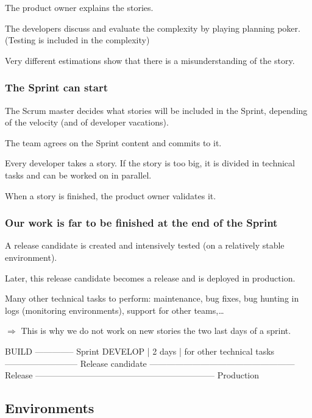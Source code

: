 \documentclass[a4paper, 11pt]{article}
\begin{document}
    The product owner explains the stories.

    The developers discuss and evaluate the complexity by playing planning poker. (Testing is included in the complexity)

    Very different estimations show that there is a misunderstanding of the story.

    \subsubsection{The Sprint can start}

    The Scrum master decides what stories will be included in the Sprint, depending of the velocity (and of developer vacations).

    The team agrees on the Sprint content and commits to it.

    Every developer takes a story. If the story is too big, it is divided in technical tasks and can be worked on in parallel.

    When a story is finished, the product owner validates it.

    \subsubsection{Our work is far to be finished at the end of the Sprint}

    A release candidate is created and intensively tested (on a relatively stable environment).

    Later, this release candidate becomes a release and is deployed in production.

    Many other technical tasks to perform: maintenance, bug fixes, bug hunting in logs (monitoring environments),
    support for other teams,\ldots

    $\Rightarrow$ This is why we do not work on new stories the two last days of a sprint.

    BUILD   -------------- Sprint
    DEVELOP             |   2 days   | for other technical tasks
            -------------------------- Release candidate
            --------------------------------------------------- Release
            --------------------------------------------------------------- Production

    \subsection{Environments}
\end{document}
